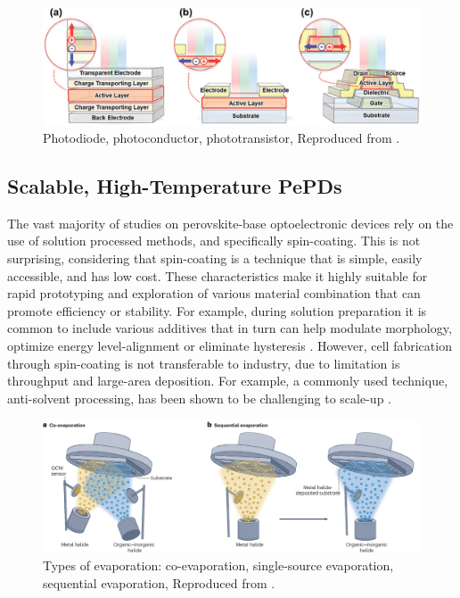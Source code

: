 \begin{figure}[htbp]
  \centering
  \medskip
  \includegraphics[width=.9\textwidth]{chapters/introduction/image/types_of_detector.jpg}
  \caption[Short caption for Table of Figures]{Photodiode, photoconductor, phototransistor, Reproduced from \cite{Yoo2021ADirections}.}
  \label{fig:ch2:types_of_detector}
\end{figure}

\subsection{Scalable, High-Temperature PePDs}



The vast majority of studies on perovskite-base optoelectronic devices rely on the use of solution processed methods, and specifically spin-coating. This is not surprising, considering that spin-coating is a technique that is simple, easily accessible, and has low cost. These characteristics make it highly suitable for rapid prototyping and exploration of various material combination that can promote efficiency or stability. For example, during solution preparation it is common to include various additives that in turn can help modulate morphology, optimize energy level-alignment or eliminate hysteresis \cite{Liu2020ACells}. However, cell fabrication through spin-coating is not transferable to industry, due to limitation is throughput and large-area deposition. For example, a commonly used technique, anti-solvent processing, has been shown to be challenging to scale-up \cite{Saki2021Solution-processedCells}.

\begin{figure}[htbp]
  \centering
  \medskip
  \includegraphics[width=.99\textwidth]{chapters/introduction/image/types_of_evaporation.png}
  \caption[Short caption for Table of Figures]{Types of evaporation: co-evaporation, single-source evaporation, sequential evaporation, Reproduced from \cite{Han2025PerovskiteCells}.}
  \label{fig:ch2:types_of_evaporation}
\end{figure}

